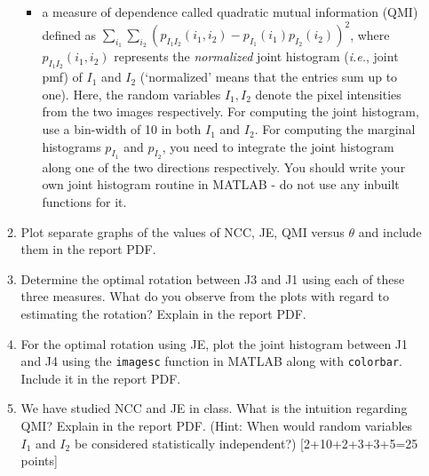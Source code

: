 \documentclass[11pt]{article}
\begin{document}
\begin{enumerate}
\begin{enumerate}
\begin{itemize}
\item a measure of dependence called quadratic mutual information (QMI) defined as $\sum_{i_1}\sum_{i_2} (p_{I_1 I_2}(i_1,i_2)-p_{I_1}(i_1)p_{I_2}(i_2))^2$, where $p_{I_1 I_2}(i_1,i_2)$ represents the \emph{normalized} joint histogram (\textit{i.e.}, joint pmf) of $I_1$ and $I_2$ (`normalized' means that the entries sum up to one). Here, the random variables $I_1, I_2$ denote the pixel intensities from the two images respectively. For computing the joint histogram, use a bin-width of 10 in both $I_1$ and $I_2$. For computing the marginal histograms $p_{I_1}$ and $p_{I_2}$, you need to integrate the joint histogram along one of the two directions respectively. You should write your own joint histogram routine in MATLAB - do not use any inbuilt functions for it. 
\end{itemize}
\item Plot separate graphs of the values of NCC, JE, QMI versus $\theta$ and include them in the report PDF. 
\item Determine the optimal rotation between J3 and J1 using each of these three measures. What do you observe from the plots with regard to estimating the rotation? Explain in the report PDF. 
\item For the optimal rotation using JE, plot the joint histogram between J1 and J4 using the \texttt{imagesc} function in MATLAB along with \texttt{colorbar}. Include it in the report PDF.
\item We have studied NCC and JE in class. What is the intuition regarding QMI? Explain in the report PDF. (Hint: When would random variables $I_1$ and $I_2$ be considered statistically independent?) 
 \textsf{[2+10+2+3+3+5=25 points]}
\end{enumerate}


\end{enumerate}
\end{document}

